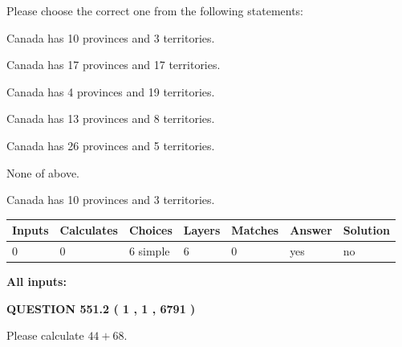 \documentclass[12pt]{article}
\begin{document}
  
Please choose the correct one from the following statements:
 
 
Canada has 10  provinces and 3 territories.
 
 
Canada has  17 provinces and  17 territories.
 
 
Canada has   4 provinces and  19 territories.
 
 
Canada has  13 provinces and  8 territories.
 
 
Canada has  26 provinces and  5 territories.
 
 
 None of above.
 
 
\noindent{}
 
 
Canada has 10  provinces and 3 territories.
 
 
\noindent{}
 
 
   
   
   
   
\noindent\begin{tabular}{|l|l|l|l|l|l|l|}
 \hline
Inputs & Calculates & Choices & Layers & Matches & Answer & Solution \\ \hline
 0  & 
 0  & 
 6
  simple  
  & 
 6  & 
 0  & 
  yes & 
  no 
  \\ \hline
 \end{tabular}
   
   
   
   
\noindent{}
   
   
   
   
\noindent\vspace{0.1in}\hspace{-0.08in} {\textbf{\Large{All inputs: }}}
   
   
  
\vspace{0.2in}
  
{\textbf{\Large{QUESTION
551.2 
 ( 1 , 1 , 6791 )
}}}
  
  
 
Please calculate $ %
44 +  %
68 $.
 
 
   
\end{document}

